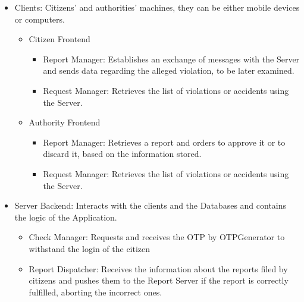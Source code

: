     \begin{itemize}

        \item Clients: Citizens' and authorities' machines, they can be either mobile devices or computers.
        
        \begin{itemize}

            \item Citizen Frontend

            \begin{itemize}

                \item Report Manager: Establishes an exchange of messages with the Server and sends data regarding the alleged violation, to be later examined.
                
                \item Request Manager: Retrieves the list of violations or accidents using the Server.
                
            \end{itemize}

            \item Authority Frontend

            \begin{itemize}

                \item Report Manager: Retrieves a report and orders to approve it or to discard it, based on the information stored.
                
                \item Request Manager: Retrieves the list of violations or accidents using the Server.
                
            \end{itemize}
            
        \end{itemize}

        \item Server Backend: Interacts with the clients and the Databases and contains the logic of the Application.
        
        \begin{itemize}
            \item Check Manager: Requests and receives the OTP by OTPGenerator to withstand the login of the citizen
            
            \item Report Dispatcher: Receives the information about the reports filed by citizens and pushes them to the Report Server if the report is correctly fulfilled, aborting the incorrect ones.


\end{itemize}
\end{itemize}
